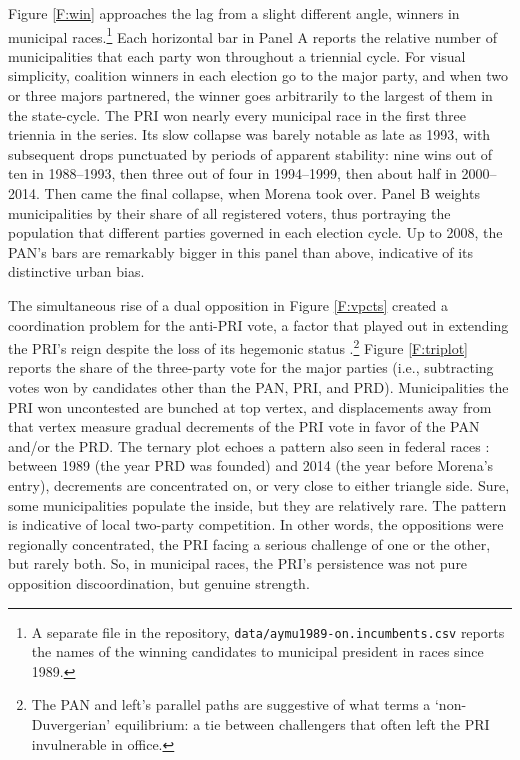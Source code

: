 \documentclass[letter,12pt]{article}
\begin{document}
Figure \ref{F:win} approaches the lag from a slight different angle, winners in municipal races.\footnote{A separate file in the repository, \verb|data/aymu1989-on.incumbents.csv| reports the names of the winning candidates to municipal president in races since 1989.} Each horizontal bar in Panel A reports the relative number of municipalities that each party won throughout a triennial cycle. For visual simplicity, coalition winners in each election go to the major party, and when two or three majors partnered, the winner goes arbitrarily to the largest of them in the state-cycle. The PRI won nearly every municipal race in the first three triennia in the series. Its slow collapse was barely notable as late as 1993, with subsequent drops punctuated by periods of apparent stability: nine wins out of ten in 1988--1993, then three out of four in 1994--1999, then about half in 2000--2014. Then came the final collapse, when Morena took over. Panel B weights municipalities by their share of all registered voters, thus portraying the population that different parties governed in each election cycle. Up to 2008, the PAN's bars are remarkably bigger in this panel than above, indicative of its distinctive urban bias. 

The simultaneous rise of a dual opposition in Figure \ref{F:vpcts} created a coordination problem for the anti-PRI vote, a factor that played out in extending the PRI's reign despite the loss of its hegemonic status \citep{magaloni.2006,garrido-phd.2014}.\footnote{The PAN and left's parallel paths are suggestive of what \citet{cox.1997} terms a `non-Duvergerian' equilibrium: a tie between challengers that often left the PRI invulnerable in office.} Figure \ref{F:triplot} reports the share of the three-party vote for the major parties (i.e., subtracting votes won by candidates other than the PAN, PRI, and PRD). Municipalities the PRI won uncontested are bunched at top vertex, and displacements away from that vertex measure gradual decrements of the PRI vote in favor of the PAN and/or the PRD. The ternary plot echoes a pattern also seen in federal races \citep{marquez.vsData.2014}: between 1989 (the year PRD was founded) and 2014 (the year before Morena's entry), decrements are concentrated on, or very close to either triangle side. Sure, some municipalities populate the inside, but they are relatively rare. The pattern is indicative of local two-party competition. In other words, the oppositions were regionally concentrated, the PRI facing a serious challenge of one or the other, but rarely both. So, in municipal races, the PRI's persistence was not pure opposition discoordination, but genuine strength.
\end{document}
